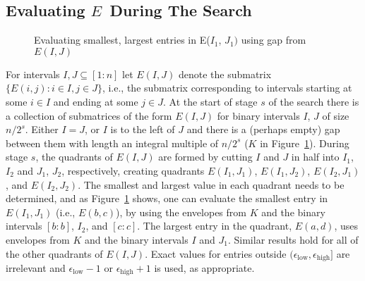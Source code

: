 \documentclass[11pt]{article}
\newcommand{\inter}[2]{\ensuremath{[#1\!:\!#2]}}
\newcommand{\epslow}{\ensuremath{\epsilon_\mathrm{low}}}
\newcommand{\epshigh}{\ensuremath{\epsilon_\mathrm{high}}}
\newcommand{\epsinterval}[1]{\ensuremath{(\epslow,\epshigh#1}}
\begin{document}
\subsection{Evaluating $E$\, During The Search}

\begin{figure}

\begin{center}
\end{center}
\vspace*{-0.2in}

\caption{Evaluating smallest, largest entries in E($I_1$, $J_1)$ using gap from $E(I,J)$}  \label{fig:Eexplain}
\vspace*{-0.08in}
\hrulefill
\vspace*{-0.15in}
\end{figure}



For intervals $I, J \subseteq \inter{1}{n}$ let $E(I,J)$ denote the submatrix $\{E(i,j): i\in I, j\in J\}$,
i.e., the submatrix corresponding to intervals starting at some $i \in I$ and ending at some $j \in J$.
At the start of stage $s$ of the search there is a collection of submatrices of the form $E(I,J)$ for binary intervals $I$, $J$ of size $n/2^s$.
Either $I = J$, or $I$ is to the left of $J$ and there is a (perhaps empty) gap between them with length an integral multiple of $n/2^s$ ($K$ in Figure~\ref{fig:Eexplain}).
During stage $s$, the quadrants of $E(I,J)$ are formed by cutting $I$ and $J$ in half into $I_1$, $I_2$ and $J_1$, $J_2$, respectively, creating quadrants $E(I_1,J_1)$, $E(I_1,J_2)$, $E(I_2,J_1)$, and $E(I_2,J_2)$.
The smallest and largest value in each quadrant needs to be determined, and as Figure~\ref{fig:Eexplain} shows, one can evaluate the smallest entry in $E(I_1,J_1)$ (i.e., $E(b,c)$), by using the envelopes from $K$ and the binary intervals \inter{b}{b}, $I_2$, and \inter{c}{c}.
The largest entry in the quadrant, $E(a,d)$, uses envelopes from $K$ and the binary intervals $I$ and $J_1$.
Similar results hold for all of the other quadrants of $E(I,J)$.
Exact values for entries outside \epsinterval{]} are irrelevant and $\epslow -1$ or $\epshigh +1$ is used, as appropriate.
\end{document}
